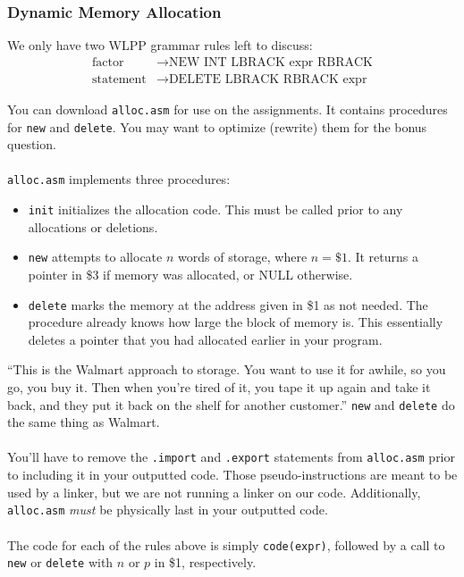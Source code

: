\documentclass[]{article}
\theoremstyle{definition}
\newcommand{\lecture}[1]{\marginpar{{\footnotesize $\leftarrow$ \underline{#1}}}}
\begin{document}
			\subsubsection{Dynamic Memory Allocation} \lecture{March 25, 2013}
				We only have two WLPP grammar rules left to discuss:
				\begin{align*}
					\text{factor} &\to \text{NEW INT LBRACK expr RBRACK} \\
					\text{statement} &\to \text{DELETE LBRACK RBRACK expr}
				\end{align*}

				You can download \verb+alloc.asm+ for use on the assignments. It contains procedures for \verb+new+ and \verb+delete+. You may want to optimize (rewrite) them for the bonus question.
				\\ \\
				\verb+alloc.asm+ implements three procedures:
				\begin{itemize}
					\item \verb+init+ initializes the allocation code. This must be called prior to any allocations or deletions.
					\item \verb+new+ attempts to allocate $n$ words of storage, where $n = \$1$. It returns a pointer in \$3 if memory was allocated, or NULL otherwise.
					\item \verb+delete+ marks the memory at the address given in \$1 as not needed. The procedure already knows how large the block of memory is. This essentially deletes a pointer that you had allocated earlier in your program.
				\end{itemize}

				``This is the Walmart approach to storage. You want to use it for awhile, so you go, you buy it. Then when you're tired of it, you tape it up again and take it back, and they put it back on the shelf for another customer.'' \verb+new+ and \verb+delete+ do the same thing as Walmart.
				\\ \\
				You'll have to remove the \verb+.import+ and \verb+.export+ statements from \verb+alloc.asm+ prior to including it in your outputted code. Those pseudo-instructions are meant to be used by a linker, but we are not running a linker on our code. Additionally, \verb+alloc.asm+ \emph{must} be physically last in your outputted code.
				\\ \\
				The code for each of the rules above is simply \verb+code(expr)+, followed by a call to \verb+new+ or \verb+delete+ with $n$ or $p$ in \$1, respectively.
\end{document}
